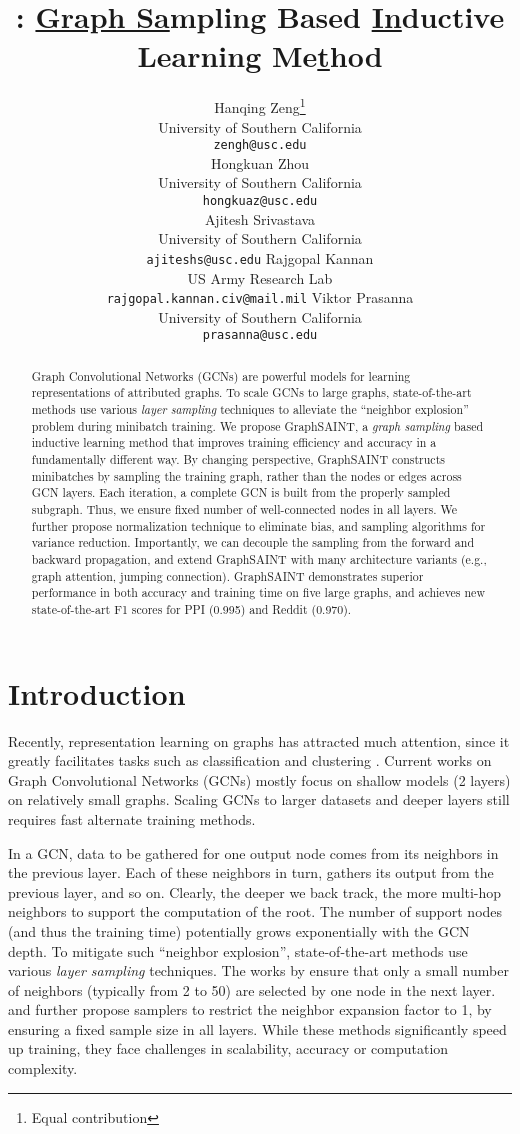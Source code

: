 \documentclass{article} \usepackage{iclr2020_conference,times}
\title{\graphsaint: \underline{Graph Sa}mpling Based  \underline{In}ductive Learning Me\underline{t}hod}
\author{Hanqing Zeng\thanks{Equal contribution}\\
University of Southern California\\
\texttt{zengh@usc.edu}\\
\And
Hongkuan Zhou\footnotemark[1]\\
University of Southern California\\
\texttt{hongkuaz@usc.edu}\\
\And
Ajitesh Srivastava\\
University of Southern California\\
\texttt{ajiteshs@usc.edu}
\And
Rajgopal Kannan\\
US Army Research Lab\\
\texttt{rajgopal.kannan.civ@mail.mil}
\And
Viktor Prasanna\\
University of Southern California\\
\texttt{prasanna@usc.edu}}
\newcommand{\graphsaint}{{\fontfamily{lmtt}\selectfont GraphSAINT}}
\begin{document}
\maketitle

\begin{abstract}
Graph Convolutional Networks (GCNs) are powerful models for learning representations of attributed graphs. To scale GCNs to large graphs, state-of-the-art methods use various \emph{layer sampling} techniques to alleviate the ``neighbor explosion'' problem during minibatch training. 
We propose {\graphsaint}, a \emph{graph sampling} based inductive learning method that improves training efficiency and accuracy in a fundamentally different way. 
By changing perspective, {\graphsaint} constructs minibatches by sampling the training graph, rather than the nodes or edges across GCN layers. 
Each iteration, a complete GCN is built from the properly sampled subgraph. Thus, we ensure fixed number of well-connected nodes in all layers. 
We further propose normalization technique to eliminate bias, and sampling algorithms for variance reduction. 
Importantly, we can decouple the sampling from the forward and backward propagation, and extend {\graphsaint} with many architecture variants (e.g., graph attention, jumping connection).  
{\graphsaint} demonstrates superior performance in both accuracy and training time on five large graphs, and achieves new state-of-the-art F1 scores for PPI (0.995) and Reddit (0.970). 
\end{abstract}
\section{Introduction}

Recently, representation learning on graphs has attracted much attention, since it greatly facilitates tasks such as classification and clustering \citep{survey1,survey2}.
Current works on Graph Convolutional Networks (GCNs) \citep{graphsage,fastgcn,lgcn,as-gcn,s-gcn} mostly focus on shallow models (2 layers) on relatively small graphs. Scaling GCNs to larger datasets and deeper layers still requires fast alternate training methods.

In a GCN, data to be gathered for one output node comes from its neighbors in the previous layer. Each of these neighbors in turn, gathers its output from the previous layer, and so on. 
Clearly, the deeper we back track, the more multi-hop neighbors to support the computation of the root. The number of support nodes (and thus the training time) potentially grows exponentially with the GCN depth. 
To mitigate such ``neighbor explosion'', state-of-the-art methods use various \textit{layer sampling} techniques. The works by \cite{graphsage,gcn_web,s-gcn} ensure that only a small number of neighbors (typically from 2 to 50) are selected by one node in the next layer.
\cite{fastgcn} and \cite{as-gcn} further propose samplers to restrict the neighbor expansion factor to 1, by ensuring a fixed sample size in all layers. 
While these methods significantly speed up training, they face challenges in scalability, accuracy or computation complexity. 
\end{document}
